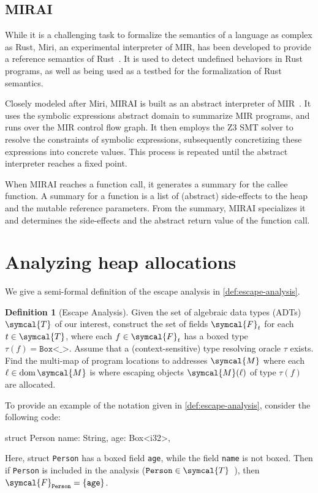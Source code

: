 \documentclass[en]{snu-ece-bsc-thesis}
\theoremstyle{definition}
\newtheorem{definition}{Definition}
\DeclareMathOperator*{\domain}{dom}
\begin{document}
\subsection{MIRAI}
While it is a challenging task to formalize the semantics of a language as complex as Rust, Miri, an experimental interpreter of MIR, has been developed to provide a reference semantics of Rust~\cite{jung:20}.
It is used to detect undefined behaviors in Rust programs, as well as being used as a testbed for the formalization of Rust semantics.

Closely modeled after Miri, MIRAI is built as an abstract interpreter of MIR~\cite{mirai}.
It uses the symbolic expressions abstract domain to summarize MIR programs, and runs over the MIR control flow graph.
It then employs the Z3 SMT solver to resolve the constraints of symbolic expressions, subsequently concretizing these expressions into concrete values.
This process is repeated until the abstract interpreter reaches a fixed point.

When MIRAI reaches a function call, it generates a summary for the callee function.
A summary for a function is a list of (abstract) side-effects to the heap and the mutable reference parameters.
From the summary, MIRAI specializes it and determines the side-effects and the abstract return value of the function call.


\section{Analyzing heap allocations}\label{sec:analyzing-heap-allocations}
We give a semi-formal definition of the escape analysis in \autoref{def:escape-analysis}.
\begin{definition}[Escape Analysis]\label{def:escape-analysis}
  Given the set of algebraic data types (ADTs) $\symcal{T}$ of our interest, construct the set of fields $\symcal{F}_t$ for each $t \in \symcal{T}$, where each $f \in \symcal{F}_t$ has a boxed type $\tau(f) = \texttt{Box<\_>}$.
  Assume that a (context-sensitive) type resolving oracle $\tau$ exists.
  Find the multi-map of program locations to addresses $\symcal{M}$ where each $\ell \in \domain\symcal{M}$ is where escaping objects $\symcal{M}(\ell)$ of type $\tau(f)$ are allocated.
\end{definition}

To provide an example of the notation given in \autoref{def:escape-analysis}, consider the following code:
\begin{rscode}
struct Person {
    name: String,
    age: Box<i32>,
}
\end{rscode}
Here, struct \verb/Person/ has a boxed field \verb/age/, while the field \verb/name/ is not boxed.
Then if \verb/Person/ is included in the analysis ($\texttt{Person} \in \symcal{T}$\ ), then $\symcal{F}_\texttt{Person} = \{\texttt{age}\}$.
\end{document}
